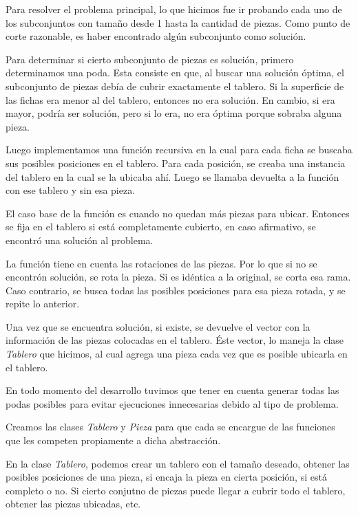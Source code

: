 \quad Para resolver el problema principal, lo que hicimos fue ir probando cada uno de los subconjuntos con tama\~no desde 1 hasta la cantidad de piezas. Como punto de corte razonable, es haber encontrado alg\'un subconjunto como soluci\'on.

\quad Para determinar si cierto subconjunto de piezas es soluci\'on, primero determinamos una poda. Esta consiste en que, al buscar una soluci\'on \'optima, el subconjunto de piezas deb\'ia de cubrir exactamente el tablero. Si la superficie de las fichas era menor al del tablero, entonces no era soluci\'on. En cambio, si era mayor, podr\'ia ser soluci\'on, pero si lo era, no era \'optima porque sobraba alguna pieza. 

\quad Luego implementamos una funci\'on recursiva en la cual para cada ficha se buscaba sus posibles posiciones en el tablero. Para cada posici\'on, se creaba una instancia del tablero en la cual se la ubicaba ah\'i. Luego se llamaba devuelta a la funci\'on con ese tablero y sin esa pieza.

\quad El caso base de la funci\'on es cuando no quedan m\'as piezas para ubicar. Entonces se fija en el tablero si est\'a completamente cubierto, en caso afirmativo, se encontr\'o una soluci\'on al problema.

\quad La funci\'on tiene en cuenta las rotaciones de las piezas. Por lo que si no se encontr\'on soluci\'on, se rota la pieza. Si es id\'entica a la original, se corta esa rama. Caso contrario, se busca todas las posibles posiciones para esa pieza rotada, y se repite lo anterior.

\quad Una vez que se encuentra soluci\'on, si existe, se devuelve el vector con la informaci\'on de las piezas colocadas en el tablero. \'Este vector, lo maneja la clase \textit{Tablero} que hicimos, al cual agrega una pieza cada vez que es posible ubicarla en el tablero.

\quad En todo momento del desarrollo tuvimos que tener en cuenta generar todas las podas posibles para evitar ejecuciones innecesarias debido al tipo de problema.

\quad Creamos las clases \textit{Tablero} y \textit{Pieza} para que cada se encargue de las funciones que les competen propiamente a dicha abstracci\'on. 

\quad En la clase \textit{Tablero}, podemos crear un tablero con el tama\~no deseado, obtener las posibles posiciones de una pieza, si encaja la pieza en cierta posici\'on, si est\'a completo o no. Si cierto conjutno de piezas puede llegar a cubrir todo el tablero, obtener las piezas ubicadas, etc.

